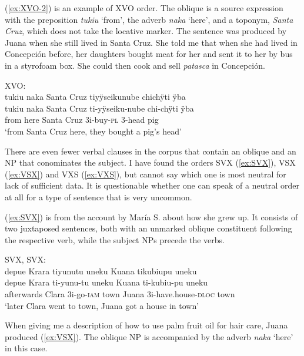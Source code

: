 (\ref{ex:XVO-2}) is an example of XVO order. The oblique is a source expression with the preposition \textit{tukiu} ‘from’, the adverb \textit{naka} ‘here’, and a toponym, \textit{Santa Cruz}, which does not take the locative marker. The sentence was produced by Juana when she still lived in Santa Cruz. She told me that when she had lived in Concepción before, her daughters bought meat for her and sent it to her by bus in a styrofoam box. She could then cook and sell \textit{patasca} in Concepción.

\ea\label{ex:XVO-2}
\begingl
\glpreamble \textup{XVO:}\\tukiu naka Santa Cruz tiyÿseikunube chichÿti ÿba\\
\gla tukiu naka {Santa Cruz} ti-yÿseiku-nube chi-chÿti ÿba\\
\glb from here {Santa Cruz} 3i-buy-\textsc{pl} 3-head pig\\
\glft ‘from Santa Cruz here, they bought a pig’s head’
\endgl
\trailingcitation{[jxx-e110923l-2.156]}
\xe




There are even fewer verbal clauses in the corpus that contain an oblique and an NP that conominates the subject. I have found the orders SVX (\ref{ex:SVX}), VSX (\ref{ex:VSX}) and VXS (\ref{ex:VXS}), but cannot say which one is most neutral for lack of sufficient data. It is questionable whether one can speak of a neutral order at all for a type of sentence that is very uncommon.

(\ref{ex:SVX}) is from the account by María S. about how she grew up. It consists of two juxtaposed sentences, both with an unmarked oblique constituent following the respective verb, while the subject NPs precede the verbs.


\ea\label{ex:SVX}
\begingl
\glpreamble \textup{SVX, SVX:}\\depue Krara tiyunutu uneku Kuana tikubiupu uneku\\
\gla depue Krara ti-yunu-tu uneku Kuana ti-kubiu-pu uneku\\
\glb afterwards Clara 3i-go-\textsc{iam} town Juana 3i-have.house-\textsc{dloc} town\\
\glft ‘later Clara went to town, Juana got a house in town’
\endgl
\trailingcitation{[rxx-p181101l-2.263]}
\xe



When giving me a description of how to use palm fruit oil for hair care, Juana produced (\ref{ex:VSX}). The oblique NP is accompanied by the adverb \textit{naka} ‘here’ in this case.

